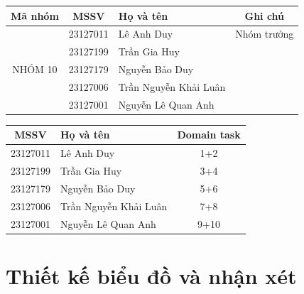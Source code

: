 \documentclass[12pt,a4paper]{article}
\begin{document}
\begin{table}[H]
\centering
\begin{tabular}{|c|c|l|c|}
\hline
\textbf{Mã nhóm} & \textbf{MSSV} & \textbf{Họ và tên} & \textbf{Ghi chú} \\ \hline
\multirow{5}{*}{NHÓM 10} & 23127011 & Lê Anh Duy & Nhóm trưởng \\ \cline{2-4} 
                         & 23127199 & Trần Gia Huy &  \\ \cline{2-4} 
                         & 23127179 & Nguyễn Bảo Duy &  \\ \cline{2-4} 
                         & 23127006 & Trần Nguyễn Khải Luân &  \\ \cline{2-4} 
                         & 23127001 & Nguyễn Lê Quan Anh &  \\ \hline
\end{tabular}
\end{table}

\vspace{1em}

\begin{table}[H]
\centering
\begin{tabular}{|c|l|c|}
\hline
\textbf{MSSV} & \textbf{Họ và tên} & \textbf{Domain task} \\ \hline
23127011 & Lê Anh Duy & 1+2 \\ \hline
23127199 & Trần Gia Huy & 3+4 \\ \hline
23127179 & Nguyễn Bảo Duy & 5+6 \\ \hline
23127006 & Trần Nguyễn Khải Luân & 7+8 \\ \hline
23127001 & Nguyễn Lê Quan Anh & 9+10 \\ \hline
\end{tabular}
\end{table}

\newpage

\newpage


\newpage

\section{Thiết kế biểu đồ và nhận xét}























\appendix

\end{document}
